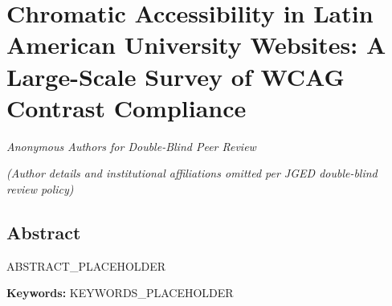 \section*{Chromatic Accessibility in Latin American University Websites: A Large-Scale Survey of WCAG Contrast Compliance}

\textit{Anonymous Authors for Double-Blind Peer Review}

\textit{(Author details and institutional affiliations omitted per JGED double-blind review policy)}

\subsection*{Abstract}

ABSTRACT_PLACEHOLDER

\textbf{Keywords:} KEYWORDS_PLACEHOLDER

